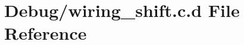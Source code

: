 \hypertarget{_debug_2wiring__shift_8c_8d}{\section{\-Debug/wiring\-\_\-shift.c.\-d \-File \-Reference}
\label{_debug_2wiring__shift_8c_8d}
}

